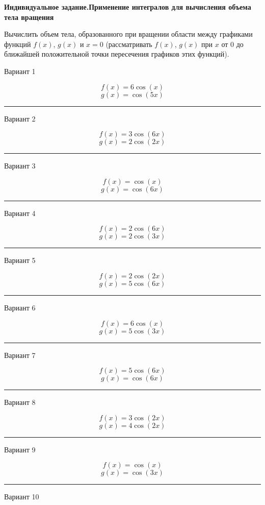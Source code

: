 \documentclass[11pt]{report}
\begin{document}
\pagestyle{empty}

{\bf Индивидуальное задание.Применение интегралов для вычисления объема тела вращения}


Вычислить объем тела, образованного при вращении области между графиками функций $f(x)$, $g(x)$ и $x = 0$ (рассматривать $f(x)$, $g(x)$ при $x$ от 0 до ближайшей положительной точки пересечения графиков этих функций).


\vspace{10mm}

Вариант 1

$$f(x)=6 \cos{\left(x \right)}$$
$$g(x)=\cos{\left(5 x \right)}$$

\rule{\textwidth}{.2mm}

Вариант 2

$$f(x)=3 \cos{\left(6 x \right)}$$
$$g(x)=2 \cos{\left(2 x \right)}$$

\rule{\textwidth}{.2mm}

Вариант 3

$$f(x)=\cos{\left(x \right)}$$
$$g(x)=\cos{\left(6 x \right)}$$

\rule{\textwidth}{.2mm}

Вариант 4

$$f(x)=2 \cos{\left(6 x \right)}$$
$$g(x)=2 \cos{\left(3 x \right)}$$

\rule{\textwidth}{.2mm}

Вариант 5

$$f(x)=2 \cos{\left(2 x \right)}$$
$$g(x)=5 \cos{\left(6 x \right)}$$

\rule{\textwidth}{.2mm}

Вариант 6

$$f(x)=6 \cos{\left(x \right)}$$
$$g(x)=5 \cos{\left(3 x \right)}$$

\rule{\textwidth}{.2mm}

Вариант 7

$$f(x)=5 \cos{\left(6 x \right)}$$
$$g(x)=\cos{\left(6 x \right)}$$

\rule{\textwidth}{.2mm}

Вариант 8

$$f(x)=3 \cos{\left(2 x \right)}$$
$$g(x)=4 \cos{\left(2 x \right)}$$

\rule{\textwidth}{.2mm}

Вариант 9

$$f(x)=\cos{\left(x \right)}$$
$$g(x)=\cos{\left(3 x \right)}$$

\rule{\textwidth}{.2mm}

Вариант 10
\end{document}
